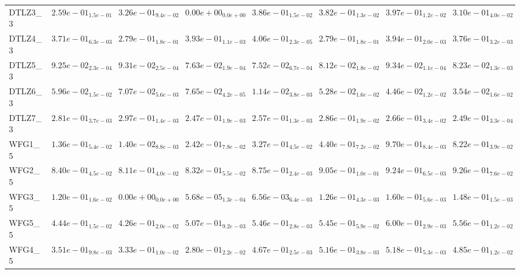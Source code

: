 \documentclass{article}
\begin{document}
\begin{landscape}
\begin{table}
\begin{scriptsize}
\begin{tabular}{llllllll}
DTLZ3\_3 & $  2.59e-01_{ 1.5e-01}$ & $  3.26e-01_{ 9.4e-02}$ & $  0.00e+00_{ 0.0e+00}$ & \cellcolor{gray25}$  3.86e-01_{ 1.5e-02}$ & $  3.82e-01_{ 1.3e-02}$ & \cellcolor{gray95}$  3.97e-01_{ 1.2e-02}$ & $  3.10e-01_{ 4.0e-02}$ \\
DTLZ4\_3 & $  3.71e-01_{ 6.3e-03}$ & $  2.79e-01_{ 1.8e-01}$ & $  3.93e-01_{ 1.1e-03}$ & \cellcolor{gray95}$  4.06e-01_{ 2.3e-05}$ & $  2.79e-01_{ 1.8e-01}$ & \cellcolor{gray25}$  3.94e-01_{ 2.0e-03}$ & $  3.76e-01_{ 3.2e-03}$ \\
DTLZ5\_3 & $  9.25e-02_{ 2.3e-04}$ & \cellcolor{gray25}$  9.31e-02_{ 2.5e-04}$ & $  7.63e-02_{ 1.9e-04}$ & $  7.52e-02_{ 6.7e-04}$ & $  8.12e-02_{ 1.8e-02}$ & \cellcolor{gray95}$  9.34e-02_{ 1.1e-04}$ & $  8.23e-02_{ 1.3e-03}$ \\
DTLZ6\_3 & $  5.96e-02_{ 1.5e-02}$ & \cellcolor{gray25}$  7.07e-02_{ 5.6e-03}$ & \cellcolor{gray95}$  7.65e-02_{ 4.2e-05}$ & $  1.14e-02_{ 3.8e-03}$ & $  5.28e-02_{ 1.6e-02}$ & $  4.46e-02_{ 1.2e-02}$ & $  3.54e-02_{ 1.6e-02}$ \\
DTLZ7\_3 & $  2.81e-01_{ 3.7e-03}$ & \cellcolor{gray95}$  2.97e-01_{ 1.4e-03}$ & $  2.47e-01_{ 1.9e-03}$ & $  2.57e-01_{ 1.3e-03}$ & \cellcolor{gray25}$  2.86e-01_{ 1.9e-02}$ & $  2.66e-01_{ 3.4e-02}$ & $  2.49e-01_{ 3.3e-04}$ \\
WFG1\_5 & $  1.36e-01_{ 5.4e-02}$ & $  1.40e-02_{ 8.8e-03}$ & $  2.42e-01_{ 7.8e-02}$ & $  3.27e-01_{ 4.5e-02}$ & $  4.40e-01_{ 7.2e-02}$ & \cellcolor{gray95}$  9.70e-01_{ 8.4e-03}$ & \cellcolor{gray25}$  8.22e-01_{ 3.9e-02}$ \\
WFG2\_5 & $  8.40e-01_{ 4.5e-02}$ & $  8.11e-01_{ 4.0e-02}$ & $  8.32e-01_{ 5.5e-02}$ & $  8.75e-01_{ 2.4e-03}$ & $  9.05e-01_{ 1.0e-01}$ & \cellcolor{gray25}$  9.24e-01_{ 6.5e-03}$ & \cellcolor{gray95}$  9.26e-01_{ 7.6e-02}$ \\
WFG3\_5 & $  1.20e-01_{ 1.6e-02}$ & $  0.00e+00_{ 0.0e+00}$ & $  5.68e-05_{ 1.3e-04}$ & $  6.56e-03_{ 6.4e-03}$ & $  1.26e-01_{ 4.3e-03}$ & \cellcolor{gray95}$  1.60e-01_{ 5.6e-03}$ & \cellcolor{gray25}$  1.48e-01_{ 1.5e-03}$ \\
WFG5\_5 & $  4.44e-01_{ 1.5e-02}$ & $  4.26e-01_{ 2.0e-02}$ & $  5.07e-01_{ 9.2e-03}$ & $  5.46e-01_{ 2.8e-03}$ & $  5.45e-01_{ 5.9e-02}$ & \cellcolor{gray95}$  6.00e-01_{ 2.9e-03}$ & \cellcolor{gray25}$  5.56e-01_{ 1.2e-02}$ \\
WFG4\_5 & $  3.51e-01_{ 9.8e-03}$ & $  3.33e-01_{ 1.0e-02}$ & $  2.80e-01_{ 2.2e-02}$ & $  4.67e-01_{ 2.5e-03}$ & \cellcolor{gray25}$  5.16e-01_{ 3.8e-03}$ & \cellcolor{gray95}$  5.18e-01_{ 5.3e-03}$ & $  4.85e-01_{ 1.2e-02}$ \\

\end{tabular}
\end{scriptsize}
\end{table}
\end{landscape}
\end{document}
